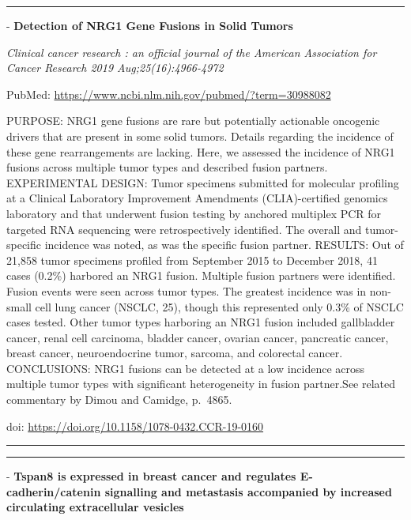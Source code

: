\documentclass[]{article}
\begin{document}
\begin{center}\rule{0.5\linewidth}{\linethickness}\end{center}

 - \textbf{Detection of NRG1 Gene Fusions in Solid Tumors}

\emph{Clinical cancer research : an official journal of the American
Association for Cancer Research 2019 Aug;25(16):4966-4972}

PubMed: \url{https://www.ncbi.nlm.nih.gov/pubmed/?term=30988082}

PURPOSE: NRG1 gene fusions are rare but potentially actionable oncogenic
drivers that are present in some solid tumors. Details regarding the
incidence of these gene rearrangements are lacking. Here, we assessed
the incidence of NRG1 fusions across multiple tumor types and described
fusion partners. EXPERIMENTAL DESIGN: Tumor specimens submitted for
molecular profiling at a Clinical Laboratory Improvement Amendments
(CLIA)-certified genomics laboratory and that underwent fusion testing
by anchored multiplex PCR for targeted RNA sequencing were
retrospectively identified. The overall and tumor-specific incidence was
noted, as was the specific fusion partner. RESULTS: Out of 21,858 tumor
specimens profiled from September 2015 to December 2018, 41 cases
(0.2\%) harbored an NRG1 fusion. Multiple fusion partners were
identified. Fusion events were seen across tumor types. The greatest
incidence was in non-small cell lung cancer (NSCLC, 25), though this
represented only 0.3\% of NSCLC cases tested. Other tumor types
harboring an NRG1 fusion included gallbladder cancer, renal cell
carcinoma, bladder cancer, ovarian cancer, pancreatic cancer, breast
cancer, neuroendocrine tumor, sarcoma, and colorectal cancer.
CONCLUSIONS: NRG1 fusions can be detected at a low incidence across
multiple tumor types with significant heterogeneity in fusion
partner.See related commentary by Dimou and Camidge, p.~4865.

doi: \url{https://doi.org/10.1158/1078-0432.CCR-19-0160}

{}

{}

\begin{center}\rule{0.5\linewidth}{\linethickness}\end{center}

\begin{center}\rule{0.5\linewidth}{\linethickness}\end{center}

 - \textbf{Tspan8 is expressed in breast cancer and regulates
E-cadherin/catenin signalling and metastasis accompanied by increased
circulating extracellular vesicles}
\end{document}
